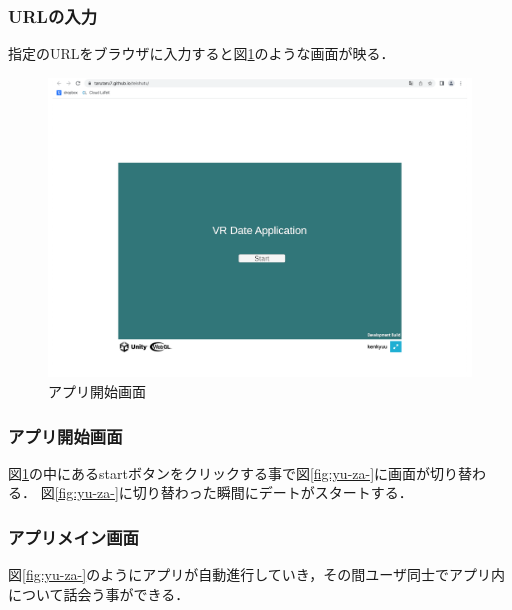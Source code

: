\documentclass[12pt,a4j,titlepage]{ltjsarticle}
\begin{document}
\subsubsection{URLの入力}
指定のURLをブラウザに入力すると図\ref{fig:kaisi}のような画面が映る．
\begin{figure}[h]
\begin{center}
\includegraphics[keepaspectratio, scale=0.5]{apurikaisi.pdf}
\end{center}
 \caption{アプリ開始画面}
 \label{fig:kaisi}
\end{figure}

\clearpage

\subsubsection{アプリ開始画面}
図\ref{fig:kaisi}の中にあるstartボタンをクリックする事で図\ref{fig:yu-za-}に画面が切り替わる．
図\ref{fig:yu-za-}に切り替わった瞬間にデートがスタートする．
\subsubsection{アプリメイン画面}
図\ref{fig:yu-za-}のようにアプリが自動進行していき，その間ユーザ同士でアプリ内について話会う事ができる．
\end{document}
